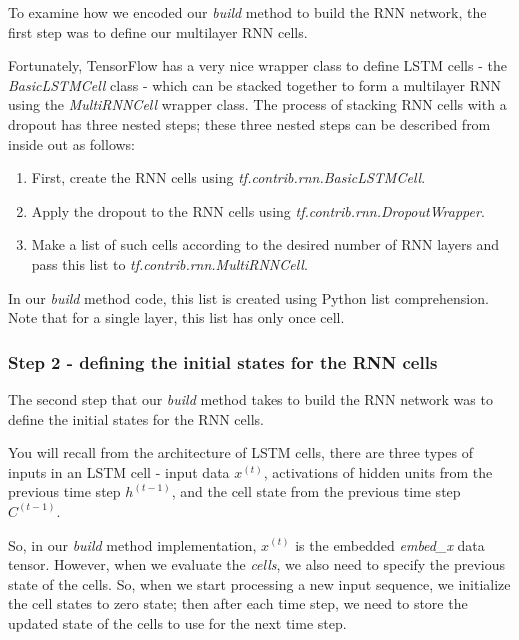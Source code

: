 \documentclass[11pt]{article}
\providecommand{\tightlist}{%
      \setlength{\itemsep}{0pt}\setlength{\parskip}{0pt}}
\begin{document}
    To examine how we encoded our \emph{build} method to build the RNN
network, the first step was to define our multilayer RNN cells.

Fortunately, TensorFlow has a very nice wrapper class to define LSTM
cells - the \emph{BasicLSTMCell} class - which can be stacked together
to form a multilayer RNN using the \emph{MultiRNNCell} wrapper class.
The process of stacking RNN cells with a dropout has three nested steps;
these three nested steps can be described from inside out as follows:

\begin{enumerate}
\def\labelenumi{\arabic{enumi}.}
\tightlist
\item
  First, create the RNN cells using \emph{tf.contrib.rnn.BasicLSTMCell}.
\item
  Apply the dropout to the RNN cells using
  \emph{tf.contrib.rnn.DropoutWrapper}.
\item
  Make a list of such cells according to the desired number of RNN
  layers and pass this list to \emph{tf.contrib.rnn.MultiRNNCell}.
\end{enumerate}

In our \emph{build} method code, this list is created using Python list
comprehension. Note that for a single layer, this list has only once
cell.

    \subsubsection{Step 2 - defining the initial states for the RNN
cells}\label{step-2---defining-the-initial-states-for-the-rnn-cells}

    The second step that our \emph{build} method takes to build the RNN
network was to define the initial states for the RNN cells.

You will recall from the architecture of LSTM cells, there are three
types of inputs in an LSTM cell - input data \(x^{(t)}\), activations of
hidden units from the previous time step \(h^{(t-1)}\), and the cell
state from the previous time step \(C^{(t-1)}\).

So, in our \emph{build} method implementation, \(x^{(t)}\) is the
embedded \emph{embed\_x} data tensor. However, when we evaluate the
\emph{cells}, we also need to specify the previous state of the cells.
So, when we start processing a new input sequence, we initialize the
cell states to zero state; then after each time step, we need to store
the updated state of the cells to use for the next time step.
\end{document}

